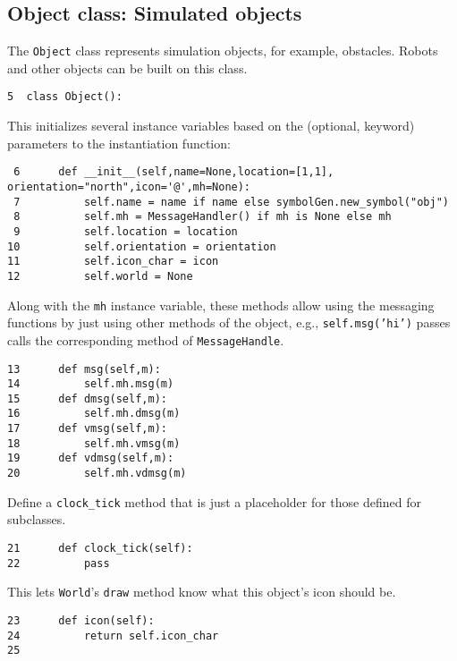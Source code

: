\documentclass[11pt]{tufte-handout}
\begin{document}
\subsection{Object class: Simulated objects}
\label{sec:org691ce1d}

The \texttt{Object} class represents simulation objects, for example, obstacles.  Robots and other objects can be built on this class.


\begin{verbatim}
5  class Object():
\end{verbatim}

This initializes several instance variables based on the (optional, keyword) parameters to the instantiation function:

\begin{verbatim}
 6      def __init__(self,name=None,location=[1,1], orientation="north",icon='@',mh=None):
 7          self.name = name if name else symbolGen.new_symbol("obj")
 8          self.mh = MessageHandler() if mh is None else mh
 9          self.location = location
10          self.orientation = orientation
11          self.icon_char = icon
12          self.world = None
\end{verbatim}

Along with the \texttt{mh} instance variable, these methods allow using the messaging functions by just using other methods of the object, e.g., \texttt{self.msg('hi')} passes calls the corresponding method of \texttt{MessageHandle}.

\begin{verbatim}
13      def msg(self,m):
14          self.mh.msg(m)
15      def dmsg(self,m):
16          self.mh.dmsg(m)
17      def vmsg(self,m):
18          self.mh.vmsg(m)
19      def vdmsg(self,m):
20          self.mh.vdmsg(m)
\end{verbatim}

Define a \texttt{clock\_tick} method that is just a placeholder for those defined for subclasses.

\begin{verbatim}
21      def clock_tick(self):
22          pass
\end{verbatim}

This lets \texttt{World}'s \texttt{draw} method know what this object's icon should be.

\begin{verbatim}
23      def icon(self):
24          return self.icon_char
25  
\end{verbatim}
\end{document}

